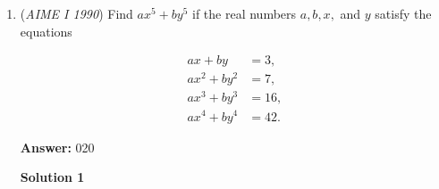 \begin{enumerate}
 Subtracting the last two equations, we get $x = 0$. Solving for $y,z$ with a bit of effort, we eventually get $x = 0$, $y = \frac {291}{2\sqrt {399}}$, $z = \frac {99}{\sqrt {133}}$.Since the area of a triangle is $\frac {1}{2}\cdot bh$, we have the base area as $18\sqrt {133}$. Thus, the volume is $V = \frac {1}{3}\cdot18\sqrt {133}\cdot\frac {99}{\sqrt {133}} = 6\cdot99 = 594$.

 



\textbf{Solution 3 (Law of Cosines)}

Let $X$ be the apex of the pyramid and $M$ be the midpoint of $\overline{CD}$. We find the side lengths of $\triangle XMP$.

 $MP = \frac{13\sqrt3}{2}$. $PX$ is half of $AC$, which is $\frac{\sqrt{3\cdot13^2+3\cdot12^2}}{2} = \frac{\sqrt{939}}{2}$. To find $MX$, consider right triangle $XMD$; since $XD=13\sqrt3$ and $MD=6\sqrt3$, we have $MX=\sqrt{3\cdot13^2-3\cdot6^2} = \sqrt{399}$.

 Let $\theta=\angle XPM$. For calculating trig, let us double all sides of $\triangle XMP$. By Law of Cosines, $\cos\theta = \frac{3\cdot13^2+939-4\cdot399}{2\cdot13\cdot3\sqrt{313}}=\frac{-150}{6\cdot13\sqrt{313}}=-\frac{25}{13\sqrt{313}}$. 

 Hence, 
 \[\sin\theta = \sqrt{1-\cos^2\theta}\]
 \[=\sqrt{1-\frac{625}{13^2\cdot313}}\]
 \[=\frac{\sqrt{13^2\cdot313-625}}{13\sqrt{313}}\]
 \[=\frac{\sqrt{3\cdot132^2}}{13\sqrt{313}}\]
 \[=\frac{132\sqrt3}{13\sqrt{313}}\]Thus, the height of the pyramid is $PX\sin\theta=\frac{\sqrt{939}}{2}\cdot\frac{132\sqrt3}{13\sqrt{313}}=\frac{66\cdot3}{13}$. Since $[CPD]=3\sqrt{3}\cdot13\sqrt{3}=9\cdot13$, the volume of the pyramid is $\frac13 \cdot 9\cdot13\cdot \frac{66\cdot3}{13}=\boxed{594}$.

 


	\item (\textit{AIME I 1990}) Find $ax^5 + by^5$ if the real numbers $a,b,x,$ and $y$ satisfy the equations

 \begin{align*} ax + by &= 3, \\ ax^2 + by^2 &= 7, \\ ax^3 + by^3 &= 16, \\ ax^4 + by^4 &= 42. \end{align*}


 \textbf{Answer: }020



\textbf{Solution 1}


\end{enumerate}
